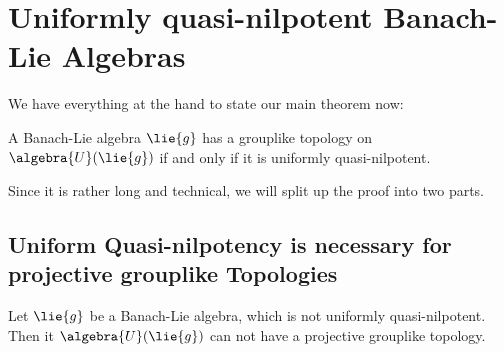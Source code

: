 \documentclass[
11pt,                          %
english                        %
]{article}
\begin{document}
\section{Uniformly quasi-nilpotent Banach-Lie Algebras}

We have everything at the hand to state our main theorem now:
\begin{theorem}
	\label{Thm:Main}
	A Banach-Lie algebra $\lie{g}$ has a grouplike topology on 
	$\algebra{U}(\lie{g})$ if and only if it is uniformly quasi-nilpotent.
\end{theorem}
Since it is rather long and technical, we will split up the proof into two parts.


\subsection{Uniform Quasi-nilpotency is necessary for projective grouplike 
Topologies}
\begin{proposition}
	\label{prop:mainthm_part_1}
	Let $\lie{g}$ be a Banach-Lie algebra, which is not uniformly 
	quasi-nilpotent. Then it $\algebra{U}(\lie{g})$ can not have a projective 
	grouplike topology.
\end{proposition}
\end{document}
